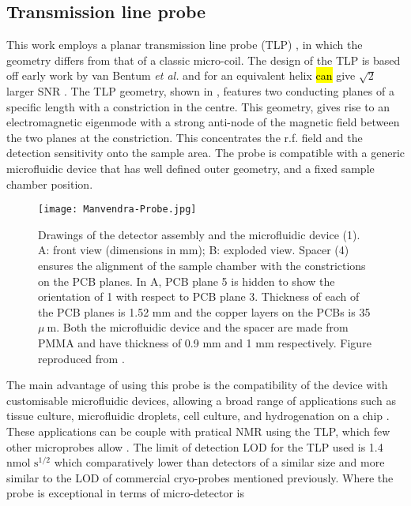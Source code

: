 \subsection{Transmission line probe}

This work employs a planar transmission line probe (TLP) \citep{Finch:2016gv, sharma2019modular}, in which the geometry
differs from that of a classic micro-coil. The design of the TLP is based off early work by van Bentum \textit{et
al.} and for an equivalent helix \hl{can} give $\sqrt{2}$ larger SNR \citep{vanBentum:2007fda}. The TLP geometry, shown in ,
features two conducting planes of a specific length with a constriction in the centre. This geometry, gives rise
to an electromagnetic eigenmode with a strong anti-node of the magnetic field between the two planes
at the constriction. This concentrates the r.f. field and the detection sensitivity onto the sample area.
The probe is compatible with a generic microfluidic device that has well defined outer geometry, and a fixed sample
chamber position.
\begin{figure}[ht]
  \begin{center}
  \texttt{[image: Manvendra-Probe.jpg]}
  \end{center}
  \caption{Drawings of the detector assembly and the microfluidic device (1). A: front view (dimensions in mm); B:
  exploded view. Spacer (4) ensures the alignment of the sample chamber with the constrictions on the PCB planes. In A,
  PCB plane 5 is hidden to show the orientation of 1 with respect to PCB plane 3. Thickness of each of the PCB planes
  is 1.52 mm and the copper layers on the PCBs is 35 $\mu~\text{m}$. Both the microfluidic device and the spacer are made from
  PMMA and have thickness of 0.9 mm and 1 mm respectively. Figure reproduced from \citep{sharma2019modular}.}
  \label{fig:MVProbe}
\end{figure}
The main advantage of using this probe is the compatibility of the device with customisable microfluidic devices, allowing
a broad range of applications such as tissue culture, microfluidic droplets, cell culture, and hydrogenation on a chip \citep{sharma2019modular}.
These applications can be couple with pratical NMR using the TLP, which few other microprobes allow \citep{RN165,RN166,RN167}.
The limit of detection LOD for the TLP used is
1.4 nmol $\text{s}^{1/2}$ which comparatively lower than detectors of a similar size and more similar to the LOD of
commercial cryo-probes mentioned previously. Where the probe is exceptional in terms of micro-detector is
